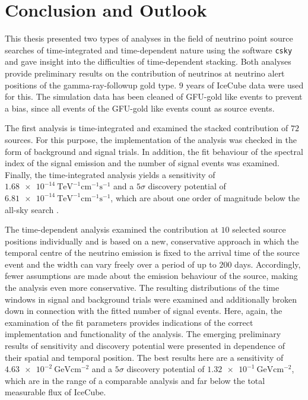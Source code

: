 \chapter{Conclusion and Outlook} \label{sec:outlook}

This thesis presented two types of analyses in the field of neutrino point source searches of time-integrated and time-dependent nature using the software \texttt{csky} and gave insight into the difficulties of time-dependent stacking.
Both analyses provide preliminary results on the contribution of neutrinos at neutrino alert positions of the gamma-ray-followup gold type.
$\num{9}$ years of IceCube data were used for this.
The simulation data has been cleaned of GFU-gold like events to prevent a bias, since all events of the GFU-gold like events count as source events.

The first analysis is time-integrated and examined the stacked contribution of $\num{72}$ sources.
For this purpose, the implementation of the analysis was checked in the form of background and signal trials.
In addition, the fit behaviour of the spectral index of the signal emission and the number of signal events was examined.
Finally, the time-integrated analysis yields a sensitivity of $\SI{1.68e-14}{\tera\electronvolt\tothe{-1}\centi\meter\tothe{-1}\second\tothe{-1}}$ and a $\num{5}\sigma$ discovery potential of $\SI{6.81e-14}{\tera\electronvolt\tothe{-1}\centi\meter\tothe{-1}\second\tothe{-1}}$, which are about one order of magnitude below the all-sky search \cite{all_sky_paper}.

The time-dependent analysis examined the contribution at $\num{10}$ selected source positions individually and is based on a new, conservative approach in which the temporal centre of the neutrino emission is fixed to the arrival time of the source event and the width can vary freely over a period of up to $\num{200}$ days.
Accordingly, fewer assumptions are made about the emission behaviour of the source, making the analysis even more conservative.
The resulting distributions of the time windows in signal and background trials were examined and additionally broken down in connection with the fitted number of signal events.
Here, again, the examination of the fit parameters provides indications of the correct implementation and functionality of the analysis.
The emerging preliminary results of sensitivity and discovery potential were presented in dependence of their spatial and temporal position.
The best results here are a sensitivity of $\SI{4.63e-2}{\giga\electronvolt\centi\meter\tothe{-2}}$ and a $\num{5}\sigma$ discovery potential of $\SI{1.32e-1}{\giga\electronvolt\centi\meter\tothe{-2}}$, which are in the range of a comparable analysis \cite{martina} and far below the total measurable flux of IceCube.

